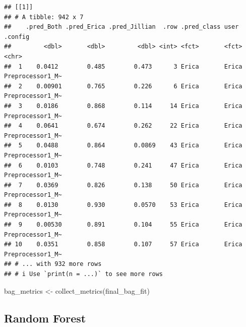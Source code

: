 \documentclass[
]{article}
\newenvironment{Shaded}{\begin{snugshade}}{\end{snugshade}}
\newcommand{\FunctionTok}[1]{\textcolor[rgb]{0.00,0.00,0.00}{#1}}
\newcommand{\NormalTok}[1]{#1}
\newcommand{\OtherTok}[1]{\textcolor[rgb]{0.56,0.35,0.01}{#1}}
\begin{document}
\begin{verbatim}
## [[1]]
## # A tibble: 942 x 7
##    .pred_Both .pred_Erica .pred_Jillian  .row .pred_class user  .config         
##         <dbl>       <dbl>         <dbl> <int> <fct>       <fct> <chr>           
##  1    0.0412        0.485        0.473      3 Erica       Erica Preprocessor1_M~
##  2    0.00901       0.765        0.226      6 Erica       Erica Preprocessor1_M~
##  3    0.0186        0.868        0.114     14 Erica       Erica Preprocessor1_M~
##  4    0.0641        0.674        0.262     22 Erica       Erica Preprocessor1_M~
##  5    0.0488        0.864        0.0869    43 Erica       Erica Preprocessor1_M~
##  6    0.0103        0.748        0.241     47 Erica       Erica Preprocessor1_M~
##  7    0.0369        0.826        0.138     50 Erica       Erica Preprocessor1_M~
##  8    0.0130        0.930        0.0570    53 Erica       Erica Preprocessor1_M~
##  9    0.00530       0.891        0.104     55 Erica       Erica Preprocessor1_M~
## 10    0.0351        0.858        0.107     57 Erica       Erica Preprocessor1_M~
## # ... with 932 more rows
## # i Use `print(n = ...)` to see more rows
\end{verbatim}

\begin{Shaded}
\begin{Highlighting}[]
\NormalTok{bag\_metrics }\OtherTok{\textless{}{-}} \FunctionTok{collect\_metrics}\NormalTok{(final\_bag\_fit)}
\end{Highlighting}
\end{Shaded}

\hypertarget{random-forest}{%
\subsection{Random Forest}\label{random-forest}}
\end{document}
